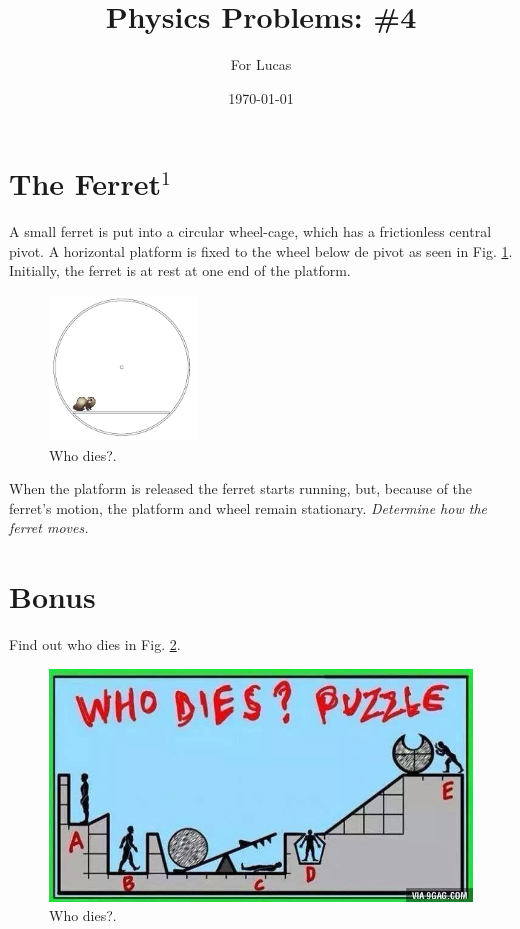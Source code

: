 \documentclass{article}
\begin{document}
\title{Physics Problems: \#4}

\author{For Lucas}

\date{\today}
\maketitle


\section*{The Ferret$^1$}

A small ferret is put into a circular wheel-cage, which has a frictionless central pivot. A horizontal platform is fixed to the wheel below de pivot as seen in Fig. \ref{fig:ferret}. Initially, the ferret is at rest at one end of the platform. \\

\begin{figure}[h!]
\begin{center}
\includegraphics[width=0.35\textwidth]{ferret}
\end{center}
\caption{Who dies?.}
\label{fig:ferret}
\end{figure}

When the platform is released the ferret starts running, but, because of the ferret's motion, the platform and wheel remain stationary. \textit{Determine how the ferret moves.}

\section*{Bonus}

Find out who dies in Fig. \ref{fig:whodies}.\\

\begin{figure}[h!]
\begin{center}
\includegraphics[width=1\textwidth]{whodies}
\end{center}
\caption{Who dies?.}
\label{fig:whodies}
\end{figure}
\end{document}

